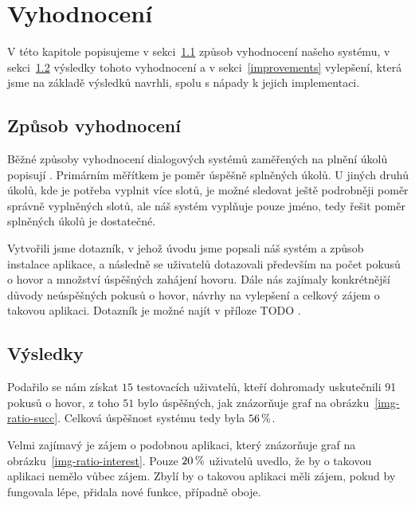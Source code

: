 \chapter{Vyhodnocení}

V této kapitole popisujeme v sekci~\ref{methods} způsob vyhodnocení našeho systému,
v sekci~\ref{results} výsledky tohoto vyhodnocení a v sekci~\ref{improvements}
vylepšení, která jsme na základě výsledků navrhli, spolu s nápady k jejich implementaci.

\section{Způsob vyhodnocení}\label{methods}

Běžné způsoby vyhodnocení dialogových systémů zaměřených na plnění úkolů popisují
\citet[podsekce 24.5.2]{jurafsky_slp_2020}. Primárním měřítkem je poměr úspěšně
splněných úkolů. U jiných druhů úkolů, kde je potřeba vyplnit více slotů, je možné
sledovat ještě podrobněji poměr správně vyplněných slotů, ale náš systém
vyplňuje pouze jméno, tedy řešit poměr splněných úkolů je dostatečné.

Vytvořili jsme dotazník, v jehož úvodu jsme popsali náš systém a způsob instalace
aplikace, a následně se uživatelů dotazovali především na počet pokusů o hovor a
množství úspěšných zahájení hovoru. Dále nás zajímaly konkrétnější důvody neúspěšných
pokusů o hovor, návrhy na vylepšení a celkový zájem o takovou aplikaci. Dotazník je
možné najít v příloze TODO .

\section{Výsledky}\label{results}

Podařilo se nám získat \(15\) testovacích uživatelů, kteří dohromady uskutečnili 91
pokusů o hovor, z toho \(51\) bylo úspěšných, jak znázorňuje
graf na obrázku~\ref{img-ratio-succ}. Celková úspěšnost
systému tedy byla \(56\,\rm \%\).

Velmi zajímavý je zájem o podobnou aplikaci, který znázorňuje graf na obrázku~\ref{img-ratio-interest}.
Pouze \(20\,\rm \%\) uživatelů uvedlo, že by o takovou aplikaci nemělo vůbec zájem.
Zbylí by o takovou aplikaci měli zájem, pokud by fungovala lépe, přidala nové funkce,
případně oboje.


